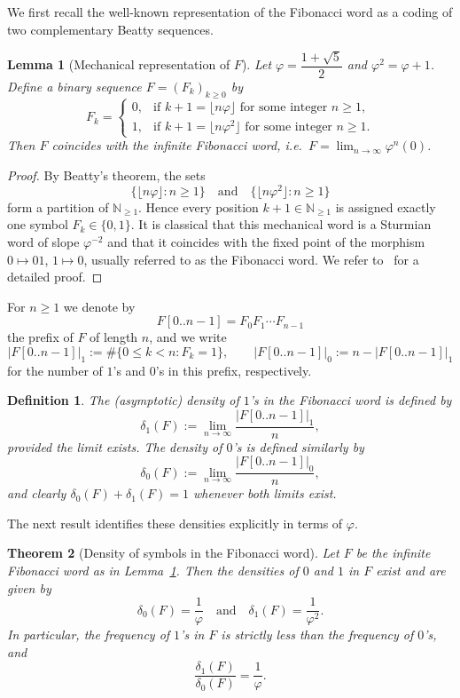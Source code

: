 \documentclass[12pt, a4paper]{article}
\newtheorem{theorem}{Theorem}[section]
\newtheorem{lemma}[theorem]{Lemma}
\newtheorem{definition}{Definition}
\begin{document}
We first recall the well-known representation of the Fibonacci word as a coding of two complementary Beatty sequences.

\begin{lemma}[Mechanical representation of $F$]\label{lem:mechanical}
Let $\varphi = \dfrac{1+\sqrt{5}}{2}$ and $\varphi^2 = \varphi + 1$. Define a binary sequence $F = (F_k)_{k \ge 0}$ by
\[
F_k =
\begin{cases}
0, & \text{if } k+1 = \lfloor n\varphi \rfloor \text{ for some integer } n \ge 1,\\[1mm]
1, & \text{if } k+1 = \lfloor n\varphi^2 \rfloor \text{ for some integer } n \ge 1.
\end{cases}
\]
Then $F$ coincides with the infinite Fibonacci word, i.e.\ $F = \lim_{n\to\infty} \varphi^n(0)$.
\end{lemma}

\begin{proof}
By Beatty's theorem, the sets
\[
\bigl\{\lfloor n\varphi \rfloor : n \ge 1\bigr\}
\quad\text{and}\quad
\bigl\{\lfloor n\varphi^2 \rfloor : n \ge 1\bigr\}
\]
form a partition of $\mathbb{N}_{\ge 1}$. Hence every position $k+1 \in \mathbb{N}_{\ge 1}$ is assigned exactly one symbol $F_k \in \{0,1\}$. It is classical that this mechanical word is a Sturmian word of slope $\varphi^{-2}$ and that it coincides with the fixed point of the morphism $0 \mapsto 01$, $1 \mapsto 0$, usually referred to as the Fibonacci word. We refer to~\cite{Berstel2007, Berthé2016} for a detailed proof.
\end{proof}

For $n \ge 1$ we denote by
\[
F[0..n-1] = F_0 F_1 \cdots F_{n-1}
\]
the prefix of $F$ of length $n$, and we write
\[
|F[0..n-1]|_1 := \#\{0 \le k < n : F_k = 1\}, 
\qquad
|F[0..n-1]|_0 := n - |F[0..n-1]|_1
\]
for the number of $1$'s and $0$'s in this prefix, respectively.

\begin{definition}
The (asymptotic) density of $1$'s in the Fibonacci word is defined by
\[
\delta_1(F) := \lim_{n\to\infty} \frac{|F[0..n-1]|_1}{n},
\]
provided the limit exists. The density of $0$'s is defined similarly by
\[
\delta_0(F) := \lim_{n\to\infty} \frac{|F[0..n-1]|_0}{n},
\]
and clearly $\delta_0(F) + \delta_1(F) = 1$ whenever both limits exist.
\end{definition}

The next result identifies these densities explicitly in terms of $\varphi$.

\begin{theorem}[Density of symbols in the Fibonacci word]\label{thm:density}
Let $F$ be the infinite Fibonacci word as in Lemma~\ref{lem:mechanical}. Then the densities of $0$ and $1$ in $F$ exist and are given by
\[
\delta_0(F) = \frac{1}{\varphi}
\quad\text{and}\quad
\delta_1(F) = \frac{1}{\varphi^2}.
\]
In particular, the frequency of $1$'s in $F$ is strictly less than the frequency of $0$'s, and
\[
\frac{\delta_1(F)}{\delta_0(F)} = \frac{1}{\varphi}.
\]
\end{theorem}
\end{document}
